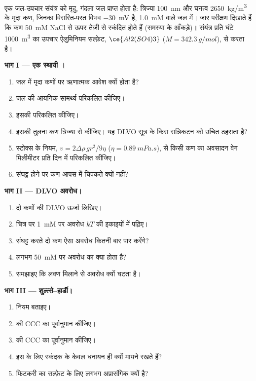 \begin{problem}
\label{pb:b3:colloids:1}
एक जल-उपचार संयंत्र को मृदु, गंदला जल प्राप्त होता है: त्रिज्या \qty{100}{nm} और
घनत्व \qty{2650}{kg/m^3} के मृदा कण, जिनका विसरित-परत विभव \qty{-30}{mV} है,
\qty{1.0}{mM}  वाले जल में। जार परीक्षण दिखाते हैं कि कण
\qty{50}{mM} NaCl से ऊपर तेज़ी से स्कंदित होते हैं (समस्या के आँकड़े)। संयंत्र प्रति घंटे \qty{1000}{m^3}
का उपचार ऐलुमिनियम सल्फ़ेट, $\ce{Al2(SO4)3}$ ($M = \qty{342.3}{g/mol}$), से करता है।

\medskip\noindent\textbf{भाग I --- एक स्थायी ।}
\begin{enumerate}
  \item जल में मृदा कणों पर ऋणात्मक आवेश क्यों होता है?
  \item जल की आयनिक सामर्थ्य परिकलित कीजिए।
  \item इसकी  परिकलित कीजिए।
  \item इसकी तुलना कण त्रिज्या से कीजिए। यह DLVO
        सूत्र के किस सन्निकटन को उचित ठहराता है?
  \item स्टोक्स के नियम, $v =
        2\Delta\rho\,gr^2/9\eta$ ($\eta = \qty{0.89}{mPa.s}$), से किसी कण का अवसादन वेग मिलीमीटर प्रति दिन में परिकलित कीजिए।
  \item संघट्ट होने पर कण आपस में चिपकते क्यों नहीं?
\end{enumerate}

\medskip\noindent\textbf{भाग II --- DLVO अवरोध।}
\begin{enumerate}[resume]
  \item दो कणों की DLVO ऊर्जा लिखिए।
  \item चित्र पर \qty{1}{mM} पर अवरोध $kT$ की इकाइयों में पढ़िए।
  \item संघट्ट करते दो कण ऐसा अवरोध कितनी बार पार करेंगे?
  \item लगभग \qty{50}{mM} पर अवरोध का क्या होता है?
  \item समझाइए कि लवण मिलाने से अवरोध क्यों घटता है।
\end{enumerate}

\medskip\noindent\textbf{भाग III --- शुल्त्से--हार्डी।}
\begin{enumerate}[resume]
  \item नियम बताइए।
  \item {} की CCC का पूर्वानुमान कीजिए।
  \item {} की CCC का पूर्वानुमान कीजिए।
  \item इस  के लिए स्कंदक के केवल धनायन ही क्यों मायने रखते हैं?
  \item फिटकरी का सल्फ़ेट  के लिए लगभग अप्रासंगिक क्यों है?
\end{enumerate}


\end{problem}
